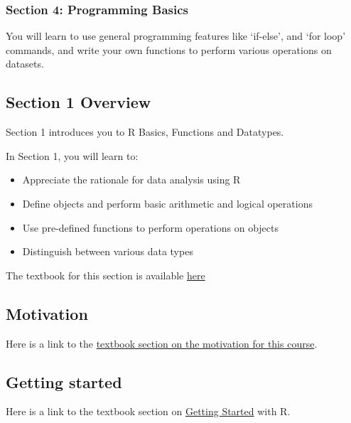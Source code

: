 \documentclass[]{article}
\providecommand{\tightlist}{%
  \setlength{\itemsep}{0pt}\setlength{\parskip}{0pt}}
\begin{document}
\hypertarget{section-4-programming-basics}{%
\subsubsection{Section 4: Programming
Basics}\label{section-4-programming-basics}}

You will learn to use general programming features like `if-else', and
`for loop' commands, and write your own functions to perform various
operations on datasets.

\hypertarget{section-1-overview}{%
\subsection{Section 1 Overview}\label{section-1-overview}}

Section 1 introduces you to R Basics, Functions and Datatypes.

In Section 1, you will learn to:

\begin{itemize}
\tightlist
\item
  Appreciate the rationale for data analysis using R
\item
  Define objects and perform basic arithmetic and logical operations
\item
  Use pre-defined functions to perform operations on objects
\item
  Distinguish between various data types
\end{itemize}

The textbook for this section is available
\href{https://rafalab.github.io/dsbook/r-basics.html}{here}

\hypertarget{motivation}{%
\subsection{Motivation}\label{motivation}}

Here is a link to the
\href{https://rafalab.github.io/dsbook/r-basics.html\#case-study-us-gun-murders}{textbook
section on the motivation for this course}.

\hypertarget{getting-started}{%
\subsection{Getting started}\label{getting-started}}

Here is a link to the textbook section on
\href{https://rafalab.github.io/dsbook/getting-started.html}{Getting
Started} with R.
\end{document}
